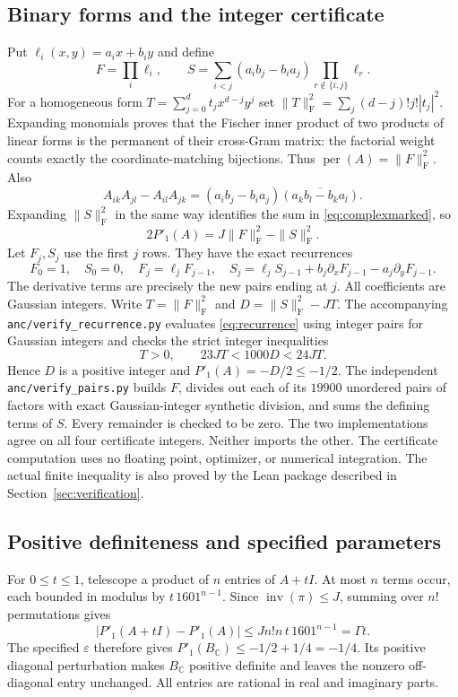 \documentclass[11pt]{article}
\theoremstyle{remark}
\DeclareMathOperator{\per}{per}
\DeclareMathOperator{\inv}{inv}
\newcommand{\C}{\mathbb C}
\begin{document}
\subsection{Binary forms and the integer certificate}
Put $\ell_i(x,y)=a_ix+b_iy$ and define
\[
 F=\prod_i\ell_i,\qquad
 S=\sum_{i<j}(a_ib_j-b_ia_j)\prod_{r\notin\{i,j\}}\ell_r.
\]
For a homogeneous form $T=\sum_{j=0}^d t_jx^{d-j}y^j$ set
$\|T\|_{\mathrm F}^2=\sum_j(d-j)!j!|t_j|^2$.
Expanding monomials proves that the Fischer inner product of two
products of linear forms is the permanent of their cross-Gram matrix:
the factorial weight counts exactly the coordinate-matching bijections.
Thus $\per(A)=\|F\|_{\mathrm F}^2$. Also
\[
 A_{ik}A_{jl}-A_{il}A_{jk}
 =(a_ib_j-b_ia_j)\overline{(a_kb_l-b_ka_l)}.
\]
Expanding $\|S\|_{\mathrm F}^2$ in the same way identifies the sum in
\eqref{eq:complexmarked}, so
\begin{equation}\label{eq:binaryendpoint}
 2P'_1(A)=J\|F\|_{\mathrm F}^2-\|S\|_{\mathrm F}^2.
\end{equation}
Let $F_j,S_j$ use the first $j$ rows. They have the exact recurrences
\begin{equation}\label{eq:recurrence}
 F_0=1,\quad S_0=0,\quad F_j=\ell_jF_{j-1},\quad
 S_j=\ell_jS_{j-1}+b_j\partial_xF_{j-1}-a_j\partial_yF_{j-1}.
\end{equation}
The derivative terms are precisely the new pairs ending at $j$.
All coefficients are Gaussian integers. Write
$T=\|F\|_{\mathrm F}^2$ and $D=\|S\|_{\mathrm F}^2-JT$.
The accompanying \texttt{anc/verify\_recurrence.py} evaluates
\eqref{eq:recurrence} using integer pairs for Gaussian integers and
checks the strict integer inequalities
\begin{equation}\label{eq:certificate}
 T>0,\qquad 23JT<1000D<24JT.
\end{equation}
Hence $D$ is a positive integer and $P'_1(A)=-D/2\le-1/2$.
The independent \texttt{anc/verify\_pairs.py} builds $F$, divides out
each of its $19900$ unordered pairs of factors with exact
Gaussian-integer synthetic division, and sums the defining terms of
$S$. Every remainder is checked to be zero. The two implementations
agree on all four certificate integers. Neither imports the other.
The certificate computation uses no floating point, optimizer, or
numerical integration. The actual finite inequality is also proved by
the Lean package described in Section~\ref{sec:verification}.

\subsection{Positive definiteness and specified parameters}
For $0\le t\le1$, telescope a product of $n$ entries of $A+tI$.
At most $n$ terms occur, each bounded in modulus by
$t\,1601^{n-1}$. Since $\inv(\pi)\le J$, summing over $n!$
permutations gives
\[
 |P'_1(A+tI)-P'_1(A)|\le Jn!n\,t\,1601^{n-1}=\Gamma t.
\]
The specified $\varepsilon$ therefore gives
$P'_1(B_{\C})\le-1/2+1/4=-1/4$.
Its positive diagonal perturbation makes $B_{\C}$ positive definite
and leaves the nonzero off-diagonal entry unchanged. All entries are
rational in real and imaginary parts.
\end{document}
